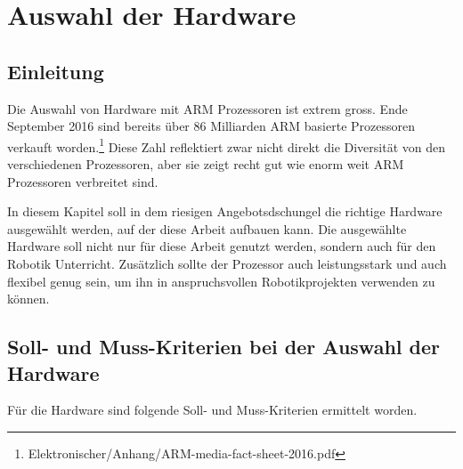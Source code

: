 \chapter{Auswahl der Hardware}

\section{Einleitung}
Die Auswahl von Hardware mit ARM Prozessoren ist extrem gross.
Ende September 2016 sind bereits über 86 Milliarden ARM basierte Prozessoren verkauft worden.\footnote{Elektronischer/Anhang/ARM-media-fact-sheet-2016.pdf}
Diese Zahl reflektiert zwar nicht direkt die Diversität von den verschiedenen Prozessoren, aber sie zeigt recht gut wie enorm weit ARM Prozessoren verbreitet sind.

In diesem Kapitel soll in dem riesigen Angebotsdschungel die richtige Hardware ausgewählt werden, auf der diese Arbeit aufbauen kann.
Die ausgewählte Hardware soll nicht nur für diese Arbeit genutzt werden, sondern auch für den Robotik Unterricht.
Zusätzlich sollte der Prozessor auch leistungsstark und auch flexibel genug sein, um ihn in anspruchsvollen Robotikprojekten verwenden zu können.


\section{Soll- und Muss-Kriterien bei der Auswahl der Hardware}
Für die Hardware sind folgende Soll- und Muss-Kriterien ermittelt worden.


